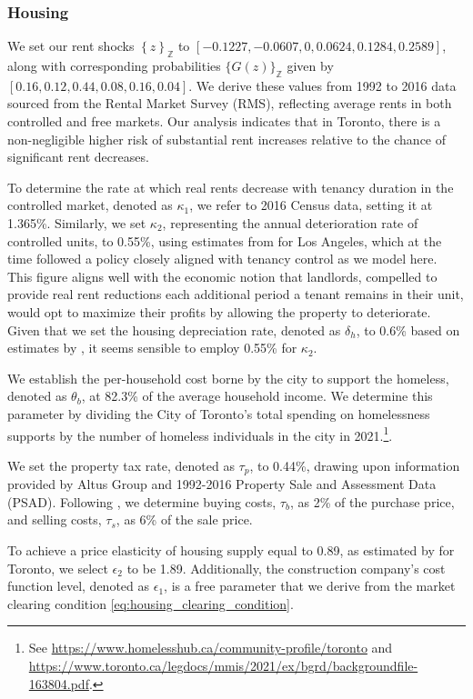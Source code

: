 \documentclass[parskip=full]{article}
\begin{document}
\subsubsection{Housing}

We set our rent shocks $\left\{z\right\}_{\mathbb{Z}}$ to $\left[-0.1227,-0.0607,0,0.0624,0.1284,0.2589\right]$, along with corresponding probabilities $\{G(z)\}_{\mathbb{Z}}$ given by $\left[0.16,0.12,0.44,0.08,0.16,0.04\right]$. We derive these values from 1992 to 2016 data sourced from the Rental Market Survey (RMS), reflecting average rents in both controlled and free markets. Our analysis indicates that in Toronto, there is a non-negligible higher risk of substantial rent increases relative to the chance of significant rent decreases.

To determine the rate at which real rents decrease with tenancy duration in the controlled market, denoted as $\kappa_{1}$, we refer to 2016 Census data, setting it at 1.365\%. Similarly, we set $\kappa_{2}$, representing the annual deterioration rate of controlled units, to 0.55\%, using estimates from \citet{murray_et_al-1991} for Los Angeles, which at the time followed a policy closely aligned with tenancy control as we model here. This figure aligns well with the economic notion that landlords, compelled to provide real rent reductions each additional period a tenant remains in their unit, would opt to maximize their profits by allowing the property to deteriorate. Given that we set the housing depreciation rate, denoted as $\delta_{h}$, to 0.6\% based on estimates by \citet{rosenthal-2014}, it seems sensible to employ 0.55\% for $\kappa_{2}$.

We establish the per-household cost borne by the city to support the homeless, denoted as $\theta_{b}$, at 82.3\% of the average household income. We determine this parameter by dividing the City of Toronto's total spending on homelessness supports by the number of homeless individuals in the city in 2021.\footnote{See \url{https://www.homelesshub.ca/community-profile/toronto} and \url{https://www.toronto.ca/legdocs/mmis/2021/ex/bgrd/backgroundfile-163804.pdf}.}.

We set the property tax rate, denoted as $\tau_p$, to 0.44\%, drawing upon information provided by Altus Group and 1992-2016 Property Sale and Assessment Data (PSAD). Following \citet{gm-2003}, we determine buying costs, $\tau_{b}$, as 2\% of the purchase price, and selling costs, $\tau_{s}$, as 6\% of the sale price.

To achieve a price elasticity of housing supply equal to 0.89, as estimated by \citet{piaxao-2021} for Toronto, we select $\epsilon_{2}$ to be 1.89. Additionally, the construction company's cost function level, denoted as $\epsilon_1$, is a free parameter that we derive from the market clearing condition \eqref{eq:housing_clearing_condition}.
\end{document}
